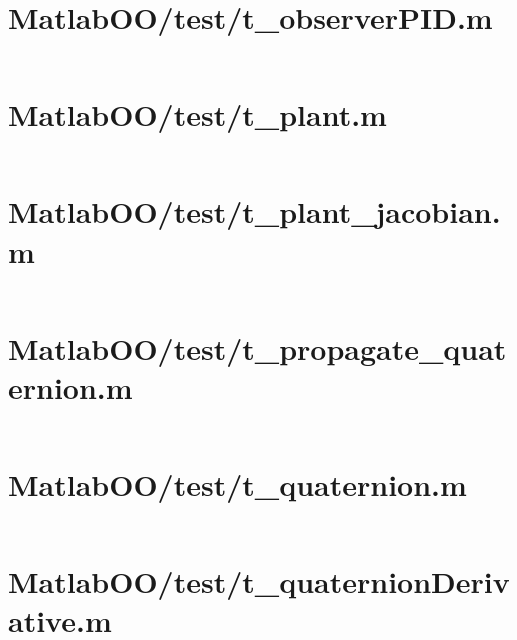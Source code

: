 \pagebreak
\section{MatlabOO/test/t\_observerPID.m}\label{code:MatlabOO/test/t_observerPID.m}
\inputminted[linenos,fontsize=\scriptsize]{matlab}{/home/dcouture/git/mathyourlife/TSatPy/beta_versions/matlab_object_oriented/test/t_observerPID.m}

\pagebreak
\section{MatlabOO/test/t\_plant.m}\label{code:MatlabOO/test/t_plant.m}
\inputminted[linenos,fontsize=\scriptsize]{matlab}{/home/dcouture/git/mathyourlife/TSatPy/beta_versions/matlab_object_oriented/test/t_plant.m}

\pagebreak
\section{MatlabOO/test/t\_plant\_jacobian.m}\label{code:MatlabOO/test/t_plant_jacobian.m}
\inputminted[linenos,fontsize=\scriptsize]{matlab}{/home/dcouture/git/mathyourlife/TSatPy/beta_versions/matlab_object_oriented/test/t_plant_jacobian.m}

\pagebreak
\section{MatlabOO/test/t\_propagate\_quaternion.m}\label{code:MatlabOO/test/t_propagate_quaternion.m}
\inputminted[linenos,fontsize=\scriptsize]{matlab}{/home/dcouture/git/mathyourlife/TSatPy/beta_versions/matlab_object_oriented/test/t_propagate_quaternion.m}

\pagebreak
\section{MatlabOO/test/t\_quaternion.m}\label{code:MatlabOO/test/t_quaternion.m}
\inputminted[linenos,fontsize=\scriptsize]{matlab}{/home/dcouture/git/mathyourlife/TSatPy/beta_versions/matlab_object_oriented/test/t_quaternion.m}

\pagebreak
\section{MatlabOO/test/t\_quaternionDerivative.m}\label{code:MatlabOO/test/t_quaternionDerivative.m}
\inputminted[linenos,fontsize=\scriptsize]{matlab}{/home/dcouture/git/mathyourlife/TSatPy/beta_versions/matlab_object_oriented/test/t_quaternionDerivative.m}

